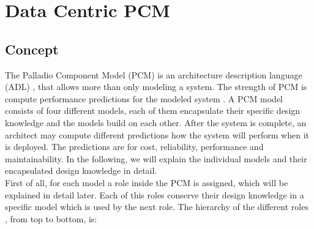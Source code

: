 \section{Data Centric PCM}
\subsection{Concept}
The Palladio Component Model (PCM) is an architecture description language (ADL) , that allows more than only modeling a system. The strength of PCM is compute performance predictions for the modeled system \cite{PCM}. 
A PCM model consists of four different models, each of them encapsulate their specific design knowledge and the models build on each other. After the system is complete, an architect may compute different predictions how the system will perform when it is deployed. The predictions are for cost, reliability, performance and maintainability. In the following, we will explain the individual models and their encapsulated design knowledge in detail. \\
First of all, for each model a role inside the PCM is assigned, which will be explained in detail later. Each of this roles conserve their design knowledge in a specific model which is used by the next role. The hierarchy of the different roles , from top to bottom, is:
